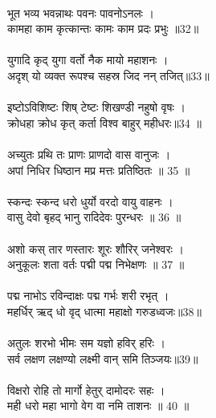 \\
भूत भव्य भवन्नाथः पवनः पावनोऽनलः ।\\
कामहा काम कृत्कान्तः कामः काम प्रदः प्रभुः ॥32॥\\
\\
युगादि कृद् युगा वर्तो नैक मायो महाशनः ।\\
अदृश् यो व्यक्त रूपश्च सहस्र जिद नन् तजित्॥33॥\\
\\
इष्टोऽविशिष्टः शिष् टेष्टः शिखण्डी नहुषो वृषः ।\\
क्रोधहा क्रोध कृत् कर्ता विश्व बाहुर् महीधरः॥34 ॥\\
\\
अच्युतः प्रथि तः प्राणः प्राणदो वास वानुजः ।\\
अपां निधिर धिष्ठान मप्र मत्तः प्रतिष्ठितः ॥ 35 ॥\\
\\
स्कन्दः स्कन्द धरो धुर्यो वरदो वायु वाहनः ।\\
वासु देवो बृहद् भानु रादिदेवः पुरन्धरः ॥ 36 ॥\\
\\
अशो कस् तार णस्तारः शूरः शौरिर् जनेश्वरः ।\\
अनुकूलः शता वर्तः पद्मी पद्म निभेक्षणः ॥ 37 ॥\\
\\
पद्म नाभोऽ रविन्दाक्षः पद्म गर्भः शरी रभृत् ।\\
महर्धिर् ऋद् धो वृद् धात्मा महाक्षो गरुडध्वजः॥38॥\\
\\
अतुलः शरभो भीमः सम यज्ञो हविर् हरिः ।\\
सर्व लक्षण लक्षण्यो लक्ष्मी वान् समि तिञ्जयः॥39॥\\
\\
विक्षरो रोहि तो मार्गो हेतुर् दामोदरः सहः ।\\
मही धरो महा भागो वेग वा नमि ताशनः ॥ 40 ॥\\
